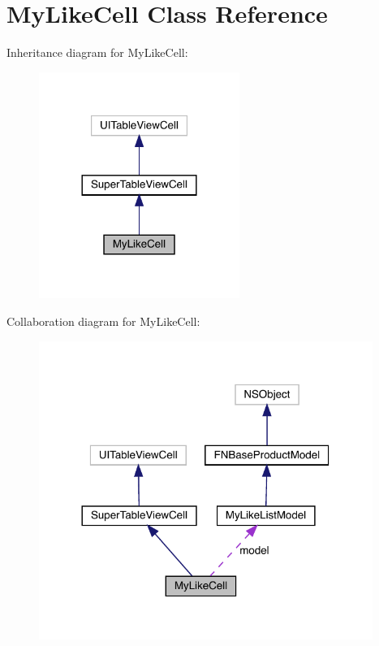 \hypertarget{interface_my_like_cell}{}\section{My\+Like\+Cell Class Reference}
\label{interface_my_like_cell}


Inheritance diagram for My\+Like\+Cell\+:\nopagebreak
\begin{figure}[H]
\begin{center}
\leavevmode
\includegraphics[width=185pt]{interface_my_like_cell__inherit__graph}
\end{center}
\end{figure}


Collaboration diagram for My\+Like\+Cell\+:\nopagebreak
\begin{figure}[H]
\begin{center}
\leavevmode
\includegraphics[width=308pt]{interface_my_like_cell__coll__graph}
\end{center}
\end{figure}
